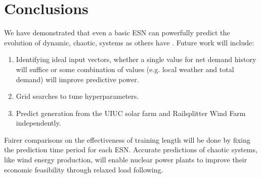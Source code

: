 \section{Conclusions}

We have demonstrated that even a basic \acrshort{ESN} can
powerfully predict the evolution of dynamic, chaotic, systems as others have
\cite{pathak_model-free_2018,wikner_combining_2020,bianchi_reservoir_2020}.
Future work will include:
\begin{enumerate}
  \item Identifying ideal input vectors, whether a single value for net demand
  history will suffice or some combination of values (e.g. local weather and
  total demand) will improve predictive power.
  \item Grid searches to tune hyperparameters.
  \item Predict generation from the UIUC solar farm and Railsplitter Wind Farm
  independently.
\end{enumerate}
Fairer comparisons on the effectiveness of training length will be done by
fixing the prediction time period for each ESN.
Accurate predictions of chaotic systems, like wind energy production, will
enable nuclear power plants to improve their economic feasibility through
relaxed load following.
